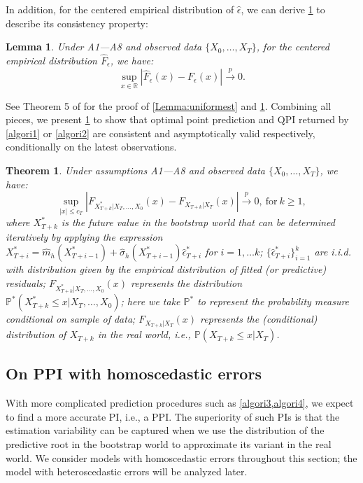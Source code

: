 \documentclass[a4paper]{article}
\newtheorem{Theorem}{Theorem}[section]
\newtheorem{Lemma}{Lemma}[section]
\begin{document}
  In addition, for the centered empirical distribution of $\hat{\epsilon}$, we can derive \cref{Lemma:uniformres} to describe its consistency property:
\begin{Lemma}\label{Lemma:uniformres}
Under A1---A8 and observed data $\{X_0,\ldots,X_T\}$, for the centered empirical distribution $\widehat{F}_{\epsilon}$, we have:
\begin{equation}\label{resuniform}
        \sup_{x\in\mathbb{R}}|\widehat{F}_{\epsilon}(x) - F_{\epsilon}(x)|\overset{p}{\to} 0.
\end{equation}
\end{Lemma}
See Theorem 5 of \cite{franke2002bootstrap} for the proof of \cref{Lemma:uniformest} and \cref{Lemma:uniformres}. Combining all pieces, we present \cref{Theorem:QPI} to show that optimal point prediction and QPI returned by \cref{algori1} or \cref{algori2} are consistent and asymptotically valid respectively, conditionally on the latest observations.

\begin{Theorem}\label{Theorem:QPI}
Under assumptions A1---A8 and observed data $\{X_0,\ldots,X_T\}$, we have:
\begin{equation}\label{claim1}
    \sup_{|x|\leq c_{T}}\left| F_{X^*_{T+k}|X_T,\ldots,X_0}(x) -  F_{X_{T+k}|X_T}(x)\right| \overset{p}{\to} 0,~\text{for}~k \geq 1,\end{equation}
where $X_{T+k}^*$ is the future value in the bootstrap world that can be determined iteratively by applying the expression $X_{T+i}^{*} =  \widehat{m}_{h}(X_{T+i-1}^*) + \widehat{\sigma}_{h}(X_{T+i-1}^*)\hat{\epsilon}^*_{T+i}$ for $i = 1,\ldots k$; $\{\hat{\epsilon}^*_{T+i}\}_{i=1}^{k}$ are i.i.d. with distribution given by the empirical distribution of fitted
(or predictive) residuals; $F_{X^*_{T+k}|X_T,\ldots,X_0}(x)$ represents the distribution
$\mathbb{P}^{*}(X^{*}_{T+k}\leq x|X_T,\ldots,X_0)$; here we take $\mathbb{P}^{*}$ to represent the probability measure conditional on sample of data; $F_{X_{T+k}|X_T}(x)$ represents the (conditional) distribution of $X_{T+k}$ in the real world, i.e., $\mathbb{P}(X_{T+k}\leq x|X_T)$.
\end{Theorem}

\subsection{On PPI with homoscedastic errors}\label{Subsec:PPI}
With more complicated prediction procedures such as \cref{algori3,algori4}, we expect to find a more accurate PI, i.e., a PPI. The superiority of such   PIs is that the estimation variability can be captured when we use the distribution of the predictive root in the bootstrap world to approximate its variant in the real world. We  consider models with homoscedastic errors throughout this section; the model with heteroscedastic errors will be analyzed later. 
\end{document}
